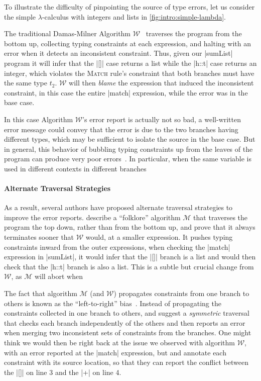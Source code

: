 To illustrate the difficulty of pinpointing the source of type errors,
let us consider the simple $\lambda$-calculus with integers and lists in
\autoref{fig:intro:simple-lambda}.


The traditional Damas-Milner Algorithm $\mathcal{W}$~\citep{Damas1982-uw}
traverses the program from the bottom up, collecting typing constraints
at each expression, and halting with an error when it detects an
inconsistent constraint.
%
Thus, given our |sumList| program it will infer that the |[]| case
returns a list while the |h::t| case returns an integer, which violates
the \textsc{Match} rule's constraint that both branches must have the
same type $t_2$.
%
$\mathcal{W}$ will then \emph{blame} the expression that induced the
inconsistent constraint, in this case the entire |match| expression,
while the error was in the base case.

In this case Algorithm $\mathcal{W}$'s error report is actually not so
bad, a well-written error message could convey that the error is due to
the two branches having different types, which may be sufficient to
isolate the source in the base case.
%
But in general, this behavior of bubbling typing constraints up from the
leaves of the program can produce very poor errors~\citep{Wand1986-nw}.
%
In particular, when the same variable is used in different contexts in
different branches 

\paragraph{Alternate Traversal Strategies}

As a result, several authors have proposed alternate traversal
strategies to improve the error reports.
%
\citet{Lee1998-ys} describe a ``folklore'' algorithm $\mathcal{M}$ that
traverses the program the top down, rather than from the bottom up, and
prove that it always terminates sooner that $\mathcal{W}$ would, \ie
at a smaller expression.
%
It pushes typing constraints inward from the outer expressions, \eg when
checking the |match| expression in |sumList|, it would infer that the
|[]| branch is a list and would then check that the |h::t| branch is
also a list.
%
This is a subtle but crucial change from $\mathcal{W}$, as $\mathcal{M}$
will abort when 

The fact that algorithm $\mathcal{M}$ (and $\mathcal{W}$) propagates
constraints from one branch to others is known as the ``left-to-right''
bias~\citep{McAdam1998-ub}.
%
Instead of propagating the constraints collected in one branch to
others, \citet{McAdam1998-ub} and \citet{Yang1999-yr} suggest a
\emph{symmetric} traversal that checks each branch independently of the
others and then reports an error when merging two inconsistent sets of
constraints from the branches.
%
One might think we would then be right back at the issue we observed
with algorithm $\mathcal{W}$, with an error reported at the |match|
expression, but \citeauthor{McAdam1998-ub} and \citeauthor{Yang1999-yr}
annotate each constraint with its source location, so that they can
report the conflict between the |[]| on line 3 and the |+|  on
line 4.

